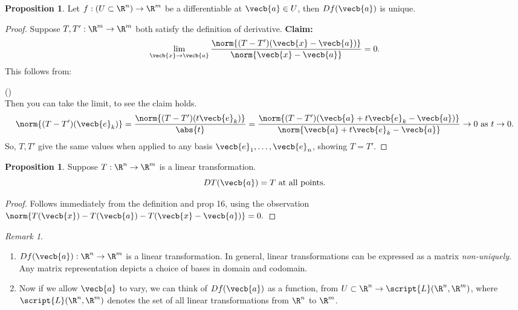 \documentclass[a5paper]{article}
\theoremstyle{definition}%
\newtheorem{proposition}[theorem]{Proposition}
\numberwithin{exercise}{section}
\theoremstyle{remark}%
\newtheorem*{remark*}{Remark}
\begin{document}
\begin{highlight}
\begin{proposition}
Let $f:(U\subset\R^n)\to\R^m$ be a differentiable at $\vecb{a}\in U$, then $Df(\vecb{a})$ is unique. 
\end{proposition}
\end{highlight}
\begin{proof}
Suppose $T, T':\R^m\to\R^m$ both satisfy the definition of derivative. 
\textbf{Claim:} 
$$\lim_{\vecb{x}\to \vecb{a}} \frac{\norm{(T-T')(\vecb{x}-\vecb{a})}}{\norm{\vecb{x}-\vecb{a}}}=0.$$
This follows from:

()\\

Then you can take the limit, to see the claim holds. \\
$$\norm{(T-T')(\vecb{e}_k)}=\frac{\norm{(T-T')(t\vecb{e}_k)}}{\abs{t}}=\frac{\norm{(T-T')(\vecb{a} + t\vecb{e}_k- \vecb{a})}}{\norm{\vecb{a} + t\vecb{e}_k - \vecb{a}}}\to 0  \text{ as } t\to 0.$$
So, $T,T'$ give the same values when applied to any basis $\vecb{e}_1, \ldots, \vecb{e}_n$, showing $T=T'$. 
\end{proof}

\begin{highlight}
\begin{proposition}
Suppose $T:\R^n\to \R^m$ is a linear transformation.
$$DT(\vecb{a})=T \text{ at all points}.$$
\end{proposition}
\end{highlight}
\begin{proof}
Follows immediately from the definition and prop 16, using the observation $\norm{T(\vecb{x})-T(\vecb{a})-T(\vecb{x}-\vecb{a})}=0.$
\end{proof}

\begin{remark*}\mbox{}
\begin{enumerate}
\item $Df(\vecb{a}):\R^n\to \R^m$ is a linear transformation. In general, linear transformations can be expressed as a matrix \emph{non-uniquely}. Any matrix representation depicts a choice of bases in domain and codomain. 
\item Now if we allow $\vecb{a}$ to vary, we can think of $Df(\vecb{a})$ as a function, from $U\subset\R^n\to \script{L}(\R^n, \R^m)$, where $\script{L}(\R^n, \R^m)$ denotes the set of all linear transformations from $\R^n$ to $\R^m$. 
\end{enumerate}
\end{remark*}
\end{document}
